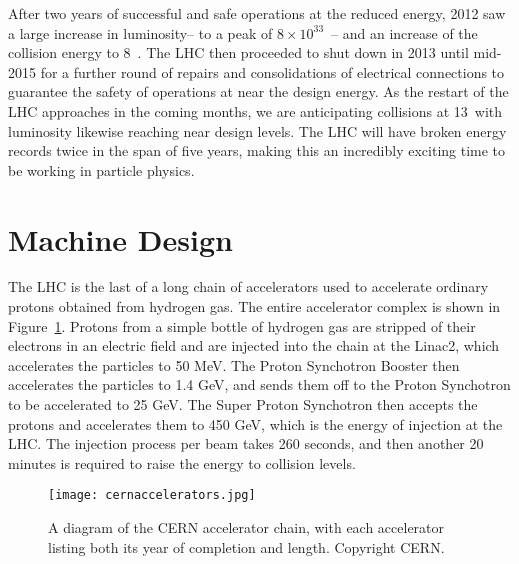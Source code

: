 After two years of successful and safe operations at the reduced energy, 2012 saw a large increase in luminosity-- to a peak of $8\times10^{33}$~\lumirate-- and an increase of the collision energy to 8~\TeV. The LHC then proceeded to shut down in 2013 until mid-2015 for a further round of repairs and consolidations of electrical connections to guarantee the safety of operations at near the design energy. As the restart of the LHC approaches in the coming months, we are anticipating collisions at 13~\TeV with luminosity likewise reaching near design levels. The LHC will have broken energy records twice in the span of five years, making this an incredibly exciting time to be working in particle physics.


\section{Machine Design}

The LHC is the last of a long chain of accelerators used to accelerate ordinary protons obtained from hydrogen gas\cite{cern-accelerators}. The entire accelerator complex is shown in Figure~\ref{fig:lhc:cern-accelerators}. Protons from a simple bottle of hydrogen gas are stripped of their electrons in an electric field and are injected into the chain at the Linac2, which accelerates the particles to 50 MeV. The Proton Synchotron Booster then accelerates the particles to 1.4 GeV, and sends them off to the Proton Synchotron to be accelerated to 25 GeV. The Super Proton Synchotron then accepts the protons and accelerates them to 450 GeV, which is the energy of injection at the LHC. The injection process per beam takes 260 seconds, and then another 20 minutes is required to raise the energy to collision levels.


\begin{figure}
\centering
\texttt{[image: cernaccelerators.jpg]}
\label{fig:lhc:cern-accelerators}
\caption{A diagram of the CERN accelerator chain, with each accelerator listing both its year of completion and length. Copyright CERN.}
\end{figure}


